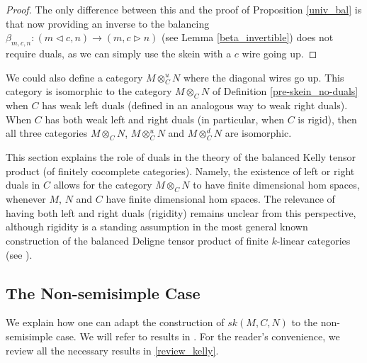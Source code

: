 \begin{proof}
  The only difference between this and the proof of Proposition \ref{univ_bal}
  is that now providing an inverse to the balancing $\beta_{m,c,n}:(m\lhd c,
  n)\to (m,c\rhd n)$ (see Lemma \ref{beta_invertible}) does not require duals,
  as we can simply use the skein with a $c$ wire going up.
\end{proof}
  
\begin{remark}
  We could also define a category $M\otimes_C^u N$ where the diagonal wires go
  up. This category is isomorphic to the category $M\otimes_C N$ of Definition
  \ref{pre-skein_no-duals} when $C$ has weak left duals (defined in an
  analogous way to weak right duals). When $C$ has both weak left and right
  duals (in particular, when $C$ is rigid), then all three categories
  $M\otimes_C N$, $M\otimes^u_C N$ and $M\otimes_C^d N$ are isomorphic.
\end{remark}

\begin{remark}

  \noindent This section explains the role of duals in the theory of the
  balanced Kelly tensor product (of finitely cocomplete categories). Namely,
  the existence of left or right duals in $C$ allows for the category
  $M \otimes_C N$ to have finite dimensional hom spaces, whenever $M$, $N$ and
  $C$ have finite dimensional hom spaces. The relevance of having both left
  and right duals (rigidity) remains unclear from this perspective, although
  rigidity is a standing assumption in the most general known construction of
  the balanced Deligne tensor product of finite $k$-linear categories (see
  \cite{douglas/balanced-product}).
\end{remark}

\subsection{The Non-semisimple Case} \label{section-nonsemisimple}

We explain how one can adapt the construction of $sk(M,C,N)$ to the
non-semisimple case. We will refer to results in
\cite{kelly/basic-concepts-enriched}. For the reader's convenience, we review
all the necessary results in \ref{review_kelly}.

